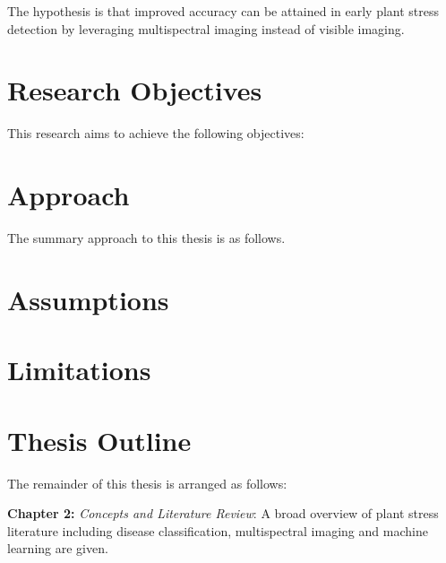     The hypothesis is that improved accuracy can be attained in early plant stress detection by leveraging multispectral imaging instead of visible imaging.
    


\section{Research Objectives}\label{Objectives}

    This research aims to achieve the following objectives:
    
    



\section{Approach}\label{Approach}

    The summary approach to this thesis is as follows.


\section{Assumptions}\label{Assumptions}





\section{Limitations}\label{Limitations}

 


\section{Thesis Outline}

    The remainder of this thesis is arranged as follows:
    
    {\bf Chapter 2:} \emph{Concepts and Literature Review}: A broad overview of plant stress literature including disease classification, multispectral imaging and machine learning are given.
    
   